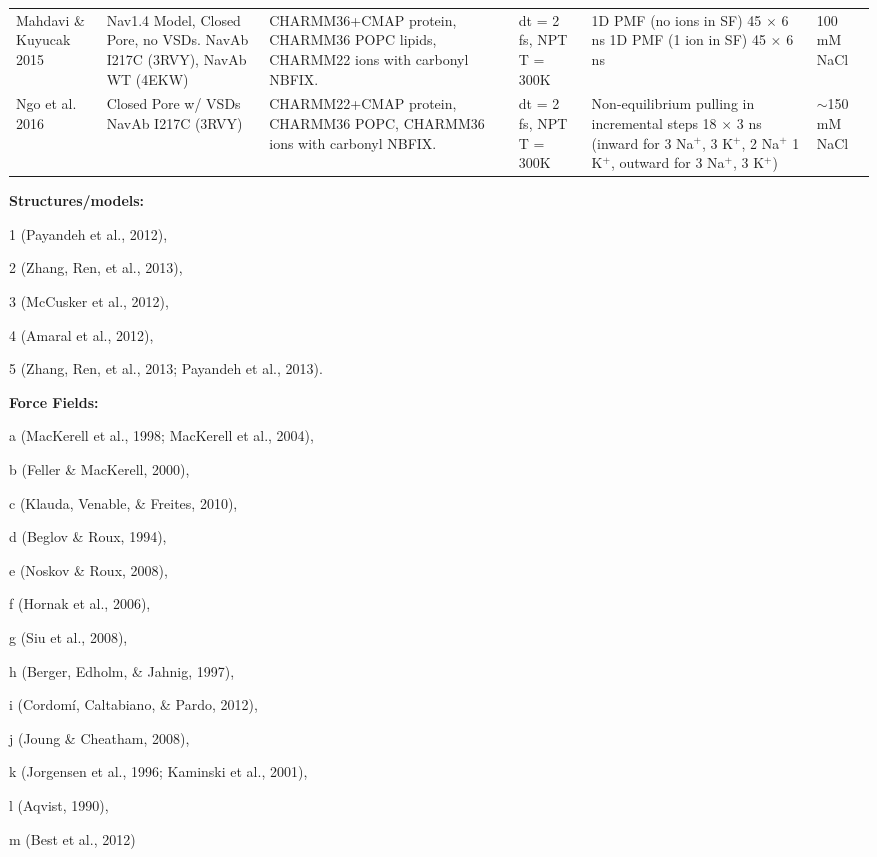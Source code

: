 \begin{refsection}
\begin{table}[]
\begin{threeparttable}
\begin{tabular}{ | p{1.5cm} | p{2.5cm} | p{3cm} | p{3cm} | p{2cm} | p{1cm} |}
Mahdavi \& Kuyucak 2015    & Nav1.4 Model, Closed Pore, no VSDs.  NavAb I217C (3RVY),\tnote{1} NavAb WT (4EKW)\tnote{5} & CHARMM36+CMAP protein,\tnote{a} CHARMM36 POPC lipids,\tnote{c} CHARMM22 ions with carbonyl NBFIX.\tnote{d,e}                                                        & dt = 2 fs, NPT T = 300K                                                     & 1D PMF (no ions in SF) 45 $\times$ 6 ns  1D PMF (1 ion in SF) 45 $\times$ 6 ns                                                      & 100 mM NaCl                           \\
Ngo et al. 2016            & Closed Pore  w/ VSDs  NavAb I217C (3RVY)\tnote{1}                                  & CHARMM22+CMAP protein,\tnote{a} CHARMM36 POPC,\tnote{c} CHARMM36 ions with carbonyl NBFIX.\tnote{d,e}                                                               & dt = 2 fs, NPT T = 300K                                                     & Non-equilibrium pulling in incremental steps 18 $\times$ 3 ns  (inward for 3 Na$^{+}$, 3 K$^{+}$, 2 Na$^{+}$ 1 K$^{+}$, outward for 3 Na$^{+}$, 3 K$^{+}$) & $\sim$150 mM NaCl                     \\ 
\bottomrule
\end{tabular}
\begin{tablenotes}[para]
\item \textbf{Structures/models:} \item [1] (Payandeh et al., 2012), \item [2] (Zhang, Ren, et al., 2013), \item [3] (McCusker et al., 2012), \item [4] (Amaral et al., 2012), \item [5] (Zhang, Ren, et al., 2013; Payandeh et al., 2013). \item \textbf{Force Fields:} \item [a] (MacKerell et al., 1998; MacKerell et al., 2004), \item [b] (Feller \& MacKerell, 2000), \item [c] (Klauda, Venable, \& Freites, 2010), \item [d] (Beglov \& Roux, 1994), \item [e] (Noskov \& Roux, 2008), \item [f] (Hornak et al., 2006), \item [g] (Siu et al., 2008), \item [h] (Berger, Edholm, \& Jahnig, 1997), \item [i] (Cordom\'i, Caltabiano, \& Pardo, 2012), \item [j] (Joung \& Cheatham, 2008), \item [k] (Jorgensen et al., 1996; Kaminski et al., 2001), \item [l] (Aqvist, 1990), \item [m] (Best et al., 2012)
\end{tablenotes}
\end{threeparttable}
\end{table}



\end{refsection}
